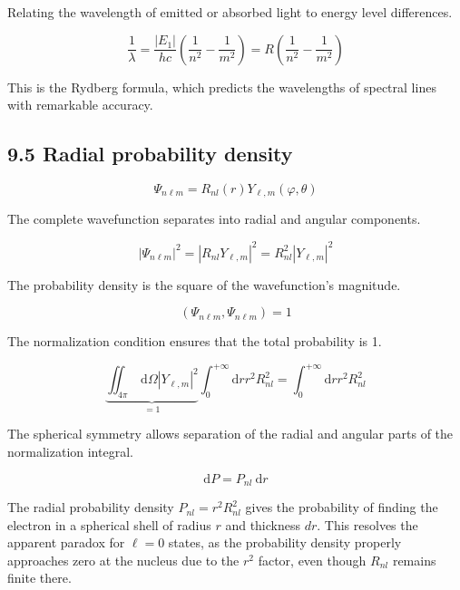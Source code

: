 \documentclass[10pt]{article}
\begin{document}
Relating the wavelength of emitted or absorbed light to energy level differences.

\begin{equation*}
\frac{1}{\lambda}=\frac{\left|E_{1}\right|}{h c}\left(\frac{1}{n^{2}}-\frac{1}{m^{2}}\right)=R\left(\frac{1}{n^{2}}-\frac{1}{m^{2}}\right) \tag{9.94}
\end{equation*}

This is the Rydberg formula, which predicts the wavelengths of spectral lines with remarkable accuracy.

\subsection*{9.5 Radial probability density}

\begin{equation*}
\Psi_{n \ell m}=R_{n l}(r) Y_{\ell, m}(\varphi, \theta) \tag{9.95}
\end{equation*}

The complete wavefunction separates into radial and angular components.

\begin{equation*}
\left|\Psi_{n \ell m}\right|^{2}=\left|R_{n l} Y_{\ell, m}\right|^{2}=R_{n l}^{2}\left|Y_{\ell, m}\right|^{2} \tag{9.96}
\end{equation*}

The probability density is the square of the wavefunction's magnitude.

\begin{equation*}
\left(\Psi_{n \ell m}, \Psi_{n \ell m}\right)=1 \tag{9.97}
\end{equation*}

The normalization condition ensures that the total probability is 1.

\begin{equation*}
\underbrace{\iint_{4 \pi} \mathrm{~d} \Omega\left|Y_{\ell, m}\right|^{2}}_{=1} \int_{0}^{+\infty} \mathrm{d} r r^{2} R_{n l}^{2}=\int_{0}^{+\infty} \mathrm{d} r r^{2} R_{n l}^{2} \tag{9.98}
\end{equation*}

The spherical symmetry allows separation of the radial and angular parts of the normalization integral.

\begin{equation*}
\mathrm{d} P=P_{n l} \mathrm{~d} r \tag{9.99}
\end{equation*}

The radial probability density $P_{nl} = r^2 R_{nl}^2$ gives the probability of finding the electron in a spherical shell of radius $r$ and thickness $dr$. This resolves the apparent paradox for $\ell=0$ states, as the probability density properly approaches zero at the nucleus due to the $r^2$ factor, even though $R_{nl}$ remains finite there.
\end{document}
